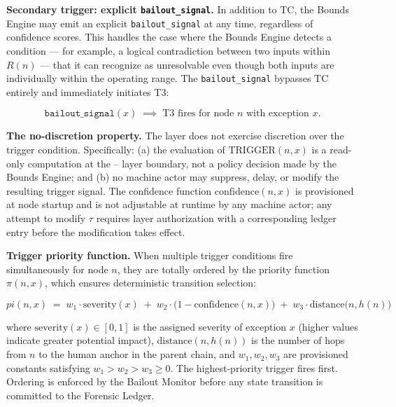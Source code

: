 \bigskip
\noindent\textbf{Secondary trigger: explicit \texttt{bailout\_signal}.} In addition to TC, the Bounds Engine may emit an explicit \texttt{bailout\_signal} at any time, regardless of confidence scores. This handles the case where the Bounds Engine detects a condition — for example, a logical contradiction between two inputs within $R(n)$ — that it can recognize as unresolvable even though both inputs are individually within the operating range. The \texttt{bailout\_signal} bypasses TC entirely and immediately initiates T3:

\begin{equation}
\texttt{bailout\_signal}(x) \;\implies\; \text{T3 fires for node } n \text{ with exception } x. \tag{TC-secondary}
\end{equation}

\bigskip
\noindent\textbf{The no-discretion property.} The \bounds{} layer does not exercise discretion over the trigger condition. Specifically: (a) the evaluation of $\text{TRIGGER}(n, x)$ is a read-only computation at the \bounds{}--\fact{} layer boundary, not a policy decision made by the Bounds Engine; and (b) no machine actor may suppress, delay, or modify the resulting trigger signal. The confidence function $\text{confidence}(n, x)$ is provisioned at node startup and is not adjustable at runtime by any machine actor; any attempt to modify $\tau$ requires \purpose{} layer authorization with a corresponding ledger entry before the modification takes effect.

\bigskip
\noindent\textbf{Trigger priority function.} When multiple trigger conditions fire simultaneously for node $n$, they are totally ordered by the priority function $\pi(n, x)$, which ensures deterministic transition selection:

\begin{equation}
pi(n, x) \;=\; w_1 \cdot \text{severity}(x) \;+\; w_2 \cdot \bigl(1 - \text{confidence}(n, x)\bigr) \;+\; w_3 \cdot \text{distance}\bigl(n, h(n)\bigr) \tag{PF}
\end{equation}

where $\text{severity}(x) \in [0, 1]$ is the assigned severity of exception $x$ (higher values indicate greater potential impact), $\text{distance}(n, h(n))$ is the number of hops from $n$ to the human anchor in the parent chain, and $w_1, w_2, w_3$ are provisioned constants satisfying $w_1 > w_2 > w_3 \geq 0$. The highest-priority trigger fires first. Ordering is enforced by the Bailout Monitor before any state transition is committed to the Forensic Ledger.

